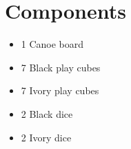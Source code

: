 \section{Components}
\begin{itemize}
    \item 1 Canoe board
    \item 7 Black play cubes
    \item 7 Ivory play cubes
    \item 2 Black dice
    \item 2 Ivory dice
\end{itemize}